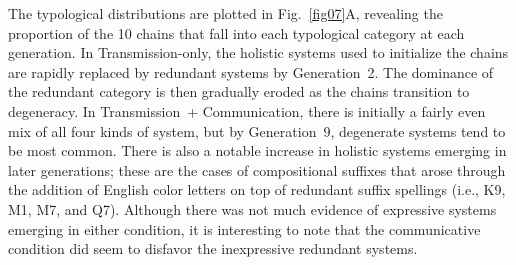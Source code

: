\documentclass[doc,biblatex]{apa7}
\begin{document}
The typological distributions are plotted in Fig.~\ref{fig07}A, revealing the proportion of the 10 chains that fall into each typological category at each generation. In Transmission-only, the holistic systems used to initialize the chains are rapidly replaced by redundant systems by Generation~2. The dominance of the redundant category is then gradually eroded as the chains transition to degeneracy. In Transmission~+ Communication, there is initially a fairly even mix of all four kinds of system, but by Generation~9, degenerate systems tend to be most common. There is also a notable increase in holistic systems emerging in later generations; these are the cases of compositional suffixes that arose through the addition of English color letters on top of redundant suffix spellings (i.e., K9, M1, M7, and Q7). Although there was not much evidence of expressive systems emerging in either condition, it is interesting to note that the communicative condition did seem to disfavor the inexpressive redundant systems.
\end{document}
